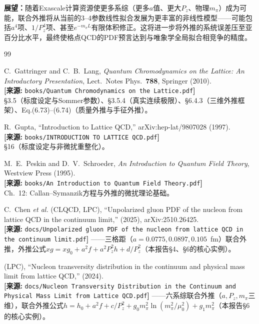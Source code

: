 \documentclass[12pt,a4paper]{ctexart}
\theoremstyle{definition}
\begin{document}
\textbf{展望：}随着Exascale计算资源使更多系综（更多$a$值、更大$P_z$、物理$m_\pi$）成为可能，联合外推将从当前的3--4参数线性拟合发展为更丰富的非线性模型——可能包括$a^4$项、$1/P_z^4$项、甚至$e^{-m_\pi L}$有限体积修正。这将进一步将外推的系统误差压至亚百分比水平，最终使格点QCD的PDF预言达到与唯象学全局拟合相竞争的精度。

\begin{thebibliography}{99}

C.~Gattringer and C.~B.~Lang,
\textit{Quantum Chromodynamics on the Lattice: An Introductory Presentation},
Lect.\ Notes Phys.\ \textbf{788}, Springer (2010).
\\\textbf{[来源:} \texttt{books/Quantum Chromodynamics on the Lattice.pdf}\textbf{]}
\\§3.5（标度设定与Sommer参数）、§3.5.4（真实连续极限）、§6.4.3（三维外推框架）、Eq.(6.73)--(6.74)（质量外推与手征外推）。

R.~Gupta,
``Introduction to Lattice QCD,''
arXiv:hep-lat/9807028 (1997).
\\\textbf{[来源:} \texttt{books/INTRODUCTION TO LATTICE QCD.pdf}\textbf{]}
\\§16（标度设定与非微扰重整化）。

M.~E.~Peskin and D.~V.~Schroeder,
\textit{An Introduction to Quantum Field Theory},
Westview Press (1995).
\\\textbf{[来源:} \texttt{books/An Introduction to Quantum Field Theory.pdf}\textbf{]}
\\Ch.~12: Callan--Symanzik方程与外推的微扰理论基础。

C.~Chen \textit{et al.} (CLQCD, LPC),
``Unpolarized gluon PDF of the nucleon from lattice QCD in the continuum limit,''
(2025), arXiv:2510.26425.
\\\textbf{[来源:} \texttt{docs/Unpolarized gluon PDF of the nucleon from lattice QCD in the continuum limit.pdf}\textbf{]}
——三格距（$a = 0.0775, 0.0897, 0.105$~fm）联合外推，外推公式$xg = xg_0 + a^2 f + a^2 P_z^2 h + d/P_z^2$（本报告§4、§6的核心实例）。

(LPC),
``Nucleon transversity distribution in the continuum and physical mass limit from lattice QCD,''
(2024).
\\\textbf{[来源:} \texttt{docs/Nucleon Transversity Distribution in the Continuum and Physical Mass Limit from Lattice QCD.pdf}\textbf{]}
——六系综联合外推（$a, P_z, m_\pi$三维），联合外推公式$h = h_0 + a^2 f + c/P_z^2 + g_0 m_\pi^2\ln(m_\pi^2/\mu_0^2) + g_1 m_\pi^2$（本报告§6的核心实例）。


\end{thebibliography}
\end{document}
